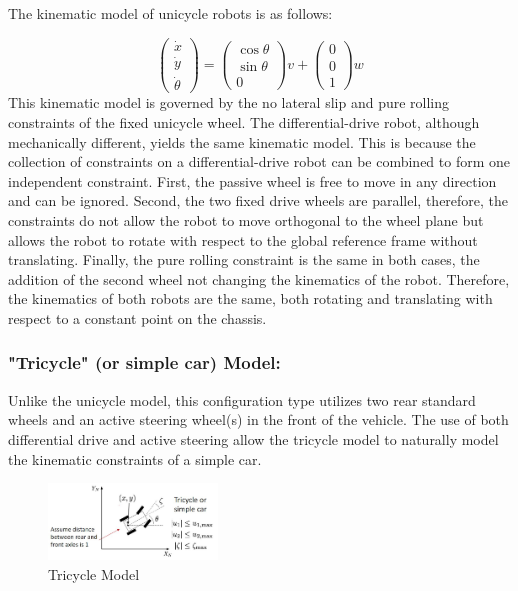 \documentclass[twoside]{article}
\begin{document}
The kinematic model of unicycle robots is as follows:

\[ \begin{pmatrix}
\dot{x} \\ \dot{y} \\ \dot{\theta}
\end{pmatrix} =
\begin{pmatrix} \cos \theta \\ \sin \theta \\ 0 \end{pmatrix} v + \begin{pmatrix} 0 \\ 0 \\ 1 \end{pmatrix} w
\]
This kinematic model is governed by the no lateral slip and pure rolling constraints of the fixed unicycle wheel. The differential-drive robot, although mechanically different, yields the same kinematic model. This is because the collection of constraints on a differential-drive robot can be combined to form one independent constraint. First, the passive wheel is free to move in any direction and can be ignored. Second, the two fixed drive wheels are parallel, therefore, the constraints do not allow the robot to move orthogonal to the wheel plane but allows the robot to rotate with respect to the global reference frame without translating. Finally, the pure rolling constraint is the same in both cases, the addition of the second wheel not changing the kinematics of the robot. Therefore, the kinematics of both robots are the same, both rotating and translating with respect to a constant point on the chassis.

\subsubsection*{"Tricycle" (or simple car) Model:}

Unlike the unicycle model, this configuration type utilizes two rear standard wheels and an active steering wheel(s) in the front of the vehicle. The use of both differential drive and active steering allow the tricycle model to naturally model the kinematic constraints of a simple car\cite{sns}.

\begin{figure}[H]
\centering
\includegraphics[width=0.4\textwidth]{tricycle}
\caption{Tricycle Model}
\end{figure}
\end{document}
